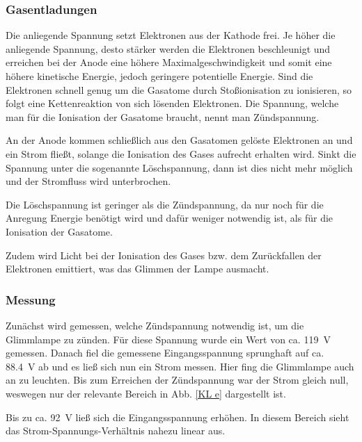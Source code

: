 \documentclass[11pt,a4paper,titlepage, ngerman]{article}
\begin{document}
			\subsubsection*{Gasentladungen}
			
				Die anliegende Spannung setzt Elektronen aus der Kathode frei.
				Je höher die anliegende Spannung, desto stärker werden die Elektronen beschleunigt und erreichen bei der Anode eine höhere Maximalgeschwindigkeit und somit eine höhere kinetische Energie, jedoch geringere potentielle Energie.
				Sind die Elektronen schnell genug um die Gasatome durch Stoßionisation zu ionisieren, so folgt eine Kettenreaktion von sich lösenden Elektronen.
				Die Spannung, welche man für die Ionisation der Gasatome braucht, nennt man Zündspannung. 
				
				An der Anode kommen schließlich aus den Gasatomen gelöste Elektronen an und ein Strom fließt, solange die Ionisation des Gases aufrecht erhalten wird.
				Sinkt die Spannung unter die sogenannte Löschspannung, dann ist dies nicht mehr möglich und der Stromfluss wird unterbrochen.

				Die Löschspannung ist geringer als die Zündspannung, da nur noch für die Anregung Energie benötigt wird und dafür weniger notwendig ist, als für die Ionisation der Gasatome.
					
				Zudem wird Licht bei der Ionisation des Gases bzw. dem Zurückfallen der Elektronen emittiert, was das \glqq Glimmen\grqq{} der Lampe ausmacht.
				
			\subsubsection*{Messung}
			
				Zunächst wird gemessen, welche Zündspannung notwendig ist, um die Glimmlampe zu zünden.
				Für diese Spannung wurde ein Wert von ca. \SI{119}{\volt} gemessen.
				Danach fiel die gemessene Eingangsspannung sprunghaft auf ca. \SI{88,4}{\volt} ab und es ließ sich nun ein Strom messen.
				Hier fing die Glimmlampe auch an zu leuchten.
				Bis zum Erreichen der Zündspannung war der Strom gleich null, weswegen nur der relevante Bereich in Abb. \ref{KL e} dargestellt ist.
				
				Bis zu ca. \SI{92}{\volt} ließ sich die Eingangsspannung erhöhen. In diesem Bereich sieht das Strom-Spannungs-Verhältnis nahezu linear aus.
				
\end{document}
